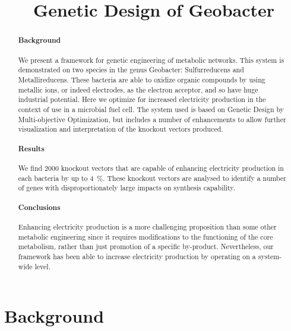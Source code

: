\documentclass[a4paper,twocolumn]{article}
\begin{document}
\title{Genetic Design of Geobacter}
\maketitle
\begin{abstract}
\paragraph{Background}
We present a framework for genetic engineering of metabolic networks. This system is demonstrated on two species in the genus Geobacter: Sulfurreducens and Metallireducens. These bacteria are able to oxidize organic compounds by using metallic ions, or indeed electrodes, as the electron acceptor, and so have huge industrial potential. Here we optimize for increased electricity production in the context of use in a microbial fuel cell. The system used is based on Genetic Design by Multi-objective Optimization, but includes a number of enhancements to allow further visualization and interpretation of the knockout vectors produced.
\paragraph{Results}
We find 2000 knockout vectors that are capable of enhancing electricity production in each bacteria by up to \SI{4}{\percent}. These knockout vectors are analysed to identify a number of genes with disproportionately large impacts on synthesis capability.
\paragraph{Conclusions}
Enhancing electricity production is a more challenging proposition than some other metabolic engineering since it requires modifications to the functioning of the core metabolism, rather than just promotion of a specific by-product. Nevertheless, our framework has been able to increase electricity production by operating on a system-wide level.

\end{abstract}

\section{Background}
\end{document}
